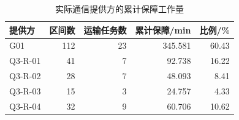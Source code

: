 \begin{table}[htbp]\centering\small
\caption{实际通信提供方的累计保障工作量}\label{tab:rev_q3_provider}
\begin{tabular}{lrrrr}\toprule
提供方 & 区间数 & 运输任务数 & 累计保障/min & 比例/\%\\\midrule
G01 & 112 & 23 & 345.581 & 60.43\\
Q3-R-01 & 41 & 7 & 92.738 & 16.22\\
Q3-R-02 & 28 & 7 & 48.093 & 8.41\\
Q3-R-03 & 15 & 3 & 24.757 & 4.33\\
Q3-R-04 & 32 & 9 & 60.706 & 10.62\\
\bottomrule\end{tabular}
\end{table}
